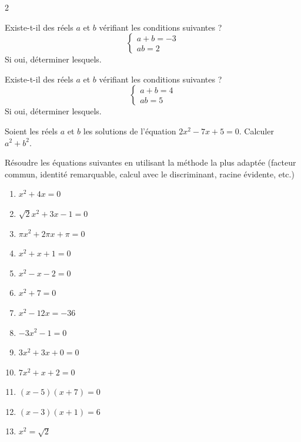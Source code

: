 \documentclass[a4paper,12pt]{article}
\begin{document}
\begin{multicols}{2}
\begin{exercice}[title=Exercice 9 \quad$\star\star$\quad\  {[Calculer]}]{}{}
Existe-t-il des réels \(a\) et \(b\) vérifiant les conditions suivantes ?
\begin{equation*}
\begin{cases}
a + b = -3 \\
ab = 2
\end{cases}
\end{equation*}
Si oui, déterminer lesquels.
\end{exercice}

\begin{exercice}[title=Exercice 10 \quad$\star\star$\quad\  {[Calculer]}]{}{}
Existe-t-il des réels \(a\) et \(b\) vérifiant les conditions suivantes ?
\begin{equation*}
\begin{cases}
a + b = 4 \\
ab = 5
\end{cases}
\end{equation*}
Si oui, déterminer lesquels.
\end{exercice}

\begin{exercice}[title=Exercice 11 \quad$\star\star\star$\quad\ {[Calculer, Chercher]}]{}{}
Soient les réels \(a\) et \(b\) les solutions de l’équation \(2x^2 - 7x + 5 = 0\). Calculer \(a^2 + b^2\).
\end{exercice}

\begin{exercice}[title=Exercice 12 \quad$\star$\quad\ {[Calculer]}]{}{}
Résoudre les équations suivantes en utilisant la méthode la plus adaptée (facteur commun, identité remarquable, calcul avec le discriminant, racine évidente, etc.)
\begin{enumerate}
    \item \(x^2 + 4x = 0\)
    \item \(\sqrt{2}x^2 + 3x - 1 = 0\)
    \item \(\pi x^2 + 2\pi x + \pi = 0\)
    \item \(x^2 + x + 1 = 0\)
    \item \(x^2 - x - 2 = 0\)
    \item \(x^2 + 7 = 0\)
    \item \(x^2 - 12x = -36\)
    \item \(-3x^2 - 1 = 0\)
    \item \(3x^2 + 3x + 0 = 0\)
    \item \(7x^2 + x + 2 = 0\)
    \item \((x - 5)(x + 7) = 0\)
    \item \((x - 3)(x + 1) = 6\)
    \item \(x^2 = \sqrt{2}\)
\end{enumerate}
\end{exercice}


\end{multicols}
\end{document}
